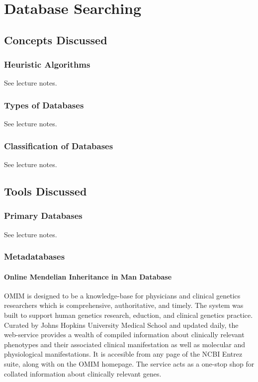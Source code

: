 
\chapter{Database Searching} 

\label{Chapter3}

\section{Concepts Discussed}

    \subsection{Heuristic Algorithms}

    See lecture notes.\autocite{T3}

    \subsection{Types of Databases}

    See lecture notes.\autocite{T3}

    \subsection{Classification of Databases}

    See lecture notes.\autocite{T3}

\section{Tools Discussed}
    
    \subsection{Primary Databases}

    See lecture notes.\autocite{T3}

    \subsection{Metadatabases}

        \subsubsection{Online Mendelian Inheritance in Man Database}

        OMIM is designed to be a knowledge-base for physicians and clinical genetics researchers which is comprehensive, authoritative, and timely.\autocite{B5} The system was built to support human genetics research, eduction, and clinical genetics practice.\autocite{B5} Curated by Johns Hopkins University Medical School and updated daily, the web-service provides a wealth of compiled information about clinically relevant phenotypes and their associated clinical manifestation as well as molecular and physiological manifestations.\autocite{B5} It is accesible from any page of the NCBI Entrez suite, along with on the OMIM homepage. The service acts as a one-stop shop for collated information about clinically relevant genes.

